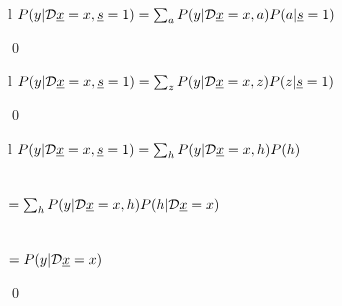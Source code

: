 \begin{claim}
\label{cl-decTransportBox}
\decTransportBox
\end{claim}
\proof
\begin{longtable}{l}
\color{red}$
P(y|{\cal D}{\underline{x}}=x, {\underline{s}}=1)
=\sum_{a}
P(y|{\cal D}{\underline{x}}=x,a)P(a|{\underline{s}}=1)$
\\
\xymatrix{\\=}
\end{longtable}
\qed

\begin{claim}
\label{cl-decTransportOne}
 \decTransportOne
\end{claim}
\proof
\begin{longtable}{l}
\color{red}
$P(y|{\cal D} {\underline{x}}=x, {\underline{s}}=1)
=\sum_z P(y|{\cal D}{\underline{x}}=x,z)P(z|{\underline{s}}=1)$
\\
\end{longtable}
\qed

\begin{claim}
\label{cl-decTransportTwo}
\decTransportTwo
\end{claim}
\proof
\begin{longtable}{l}
\color{red}
$P(y|{\cal D} {\underline{x}}=x, {\underline{s}}=1)=
\sum_h P(y|{\cal D}{\underline{x}}=x, h)P(h)$
\\
\\
\xymatrix{\\=}
\\
\color{red}
$=\sum_h P(y|{\cal D}{\underline{x}}=x, h)P(h|{\cal D}{\underline{x}}=x)$
\\
\\
\xymatrix{\\=}
\\
\color{red}
$=P(y|{\cal D}{\underline{x}}=x)$
\\
\xymatrix{=}
\end{longtable}
\qed
\begin{claim}
\label{cl-decTransportThree}
\decTransportThree
\end{claim}
\proof

